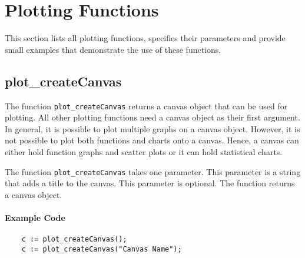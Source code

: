 \section{Plotting Functions}
This section lists all plotting functions, specifies their parameters and provide small examples
that demonstrate the use of these functions.
 

\subsection{plot\_createCanvas} 
The function \texttt{plot\_createCanvas} returns a canvas object that can be used for plotting.
All other plotting functions need a canvas object as their first argument.  In general, it is
possible to plot multiple graphs on a canvas object.  However, it is not possible to plot both
functions and charts onto a canvas.  Hence, a canvas can either hold function graphs and scatter
plots or it can hold statistical charts.

The function \texttt{plot\_createCanvas} takes one parameter.  This parameter is a string that adds
a title to the canvas. This parameter is optional.  The function returns a canvas object.

\paragraph{Example Code}
\begin{verbatim}
    c := plot_createCanvas();
    c := plot_createCanvas("Canvas Name");
\end{verbatim}

